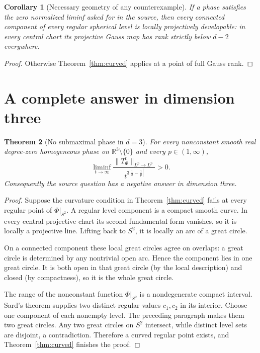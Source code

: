 \documentclass[11pt]{amsart}
\newtheorem{theorem}{Theorem}
\newtheorem{corollary}[theorem]{Corollary}
\theoremstyle{remark}
\newcommand{\R}{\mathbb R}
\begin{document}
\begin{corollary}[Necessary geometry of any counterexample]\label{cor:necessary}
If a phase satisfies the zero normalized liminf asked for in the source, then
every connected component of every regular spherical level is locally
projectively developable: in every central chart its projective Gauss map has
rank strictly below $d-2$ everywhere.
\end{corollary}

\begin{proof}
Otherwise Theorem~\ref{thm:curved} applies at a point of full Gauss rank.
\end{proof}

\section{A complete answer in dimension three}

\begin{theorem}[No submaximal phase in $d=3$]\label{thm:d3}
For every nonconstant smooth real degree-zero homogeneous phase on
$\R^3\setminus\{0\}$ and every $p\in(1,\infty)$,
\[
 \liminf_{t\to\infty}
 \frac{\|T_\Phi^t\|_{L^p\to L^p}}
 {t^{3|\frac12-\frac1p|}}>0.
\]
Consequently the source question has a negative answer in dimension three.
\end{theorem}

\begin{proof}
Suppose the curvature condition in Theorem~\ref{thm:curved} fails at every
regular point of $\Phi|_{S^2}$.  A regular level component is a compact smooth
curve.  In every central projective chart its second fundamental form
vanishes, so it is locally a projective line.  Lifting back to $S^2$, it is
locally an arc of a great circle.

On a connected component these local great circles agree on overlaps: a
great circle is determined by any nontrivial open arc.  Hence the component
lies in one great circle.  It is both open in that great circle (by the local
description) and closed (by compactness), so it is the whole great circle.

The range of the nonconstant function $\Phi|_{S^2}$ is a nondegenerate compact
interval.  Sard's theorem supplies two distinct regular values $c_1,c_2$ in
its interior.  Choose one component of each nonempty level.  The preceding
paragraph makes them two great circles.  Any two great circles on $S^2$
intersect, while distinct level sets are disjoint, a contradiction.  Therefore
a curved regular point exists, and Theorem~\ref{thm:curved} finishes the proof.
\end{proof}
\end{document}
